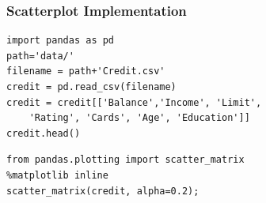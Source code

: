 

\begin{frame}[fragile]\frametitle{Scatterplot Implementation}
\tiny	
\begin{lstlisting}
import pandas as pd
path='data/'
filename = path+'Credit.csv'
credit = pd.read_csv(filename)
credit = credit[['Balance','Income', 'Limit', 
	'Rating', 'Cards', 'Age', 'Education']]
credit.head()
\end{lstlisting} 
\begin{lstlisting}
from pandas.plotting import scatter_matrix
%matplotlib inline
scatter_matrix(credit, alpha=0.2);
\end{lstlisting} 
\end{frame}



